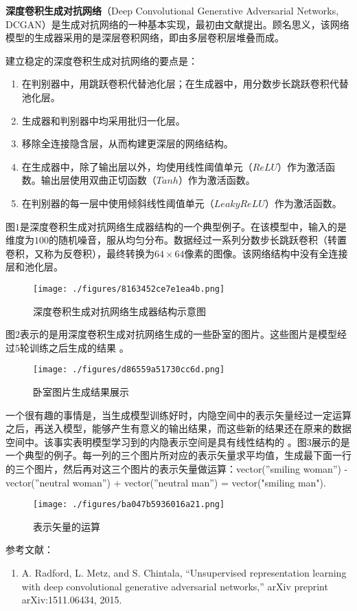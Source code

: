 

\textbf{深度卷积生成对抗网络}（Deep Convolutional Generative Adversarial Networks, DCGAN）是生成对抗网络的一种基本实现，最初由文献\cite{DCGAN}提出。顾名思义，该网络模型的生成器采用的是深层卷积网络，即由多层卷积层堆叠而成。

建立稳定的深度卷积生成对抗网络的要点是\cite{DCGAN}：
\begin{enumerate}
\item 在判别器中，用跳跃卷积代替池化层；在生成器中，用分数步长跳跃卷积代替池化层。
\item 生成器和判别器中均采用批归一化层。
\item 移除全连接隐含层，从而构建更深层的网络结构。
\item 在生成器中，除了输出层以外，均使用线性阈值单元（$ReLU$）作为激活函数。输出层使用双曲正切函数（$Tanh$）作为激活函数。
\item 在判别器的每一层中使用倾斜线性阈值单元（$Leaky ReLU$）作为激活函数。
\end{enumerate}

图$1$是深度卷积生成对抗网络生成器结构的一个典型例子。在该模型中，输入的是维度为$100$的随机噪音，服从均匀分布。数据经过一系列分数步长跳跃卷积（转置卷积，又称为反卷积），最终转换为$64 \times64$像素的图像。该网络结构中没有全连接层和池化层。
\begin{figure}[ht]
\centering
\texttt{[image: ./figures/8163452ce7e1ea4b.png]}
\caption{深度卷积生成对抗网络生成器结构示意图 \cite{DCGAN}} \label{fig_DCGAN_1}
\end{figure}

图$2$表示的是用深度卷积生成对抗网络生成的一些卧室的图片。这些图片是模型经过$5$轮训练之后生成的结果 \cite{DCGAN}。
\begin{figure}[ht]
\centering
\texttt{[image: ./figures/d86559a51730cc6d.png]}
\caption{卧室图片生成结果展示} \label{fig_DCGAN_2}
\end{figure}

一个很有趣的事情是，当生成模型训练好时，内隐空间中的表示矢量经过一定运算之后，再送入模型，能够产生有意义的输出结果，而这些新的结果还在原来的数据空间中。该事实表明模型学习到的内隐表示空间是具有线性结构的 \cite{DCGAN}。图$3$展示的是一个典型的例子。每一列的三个图片所对应的表示矢量求平均值，生成最下面一行的三个图片，然后再对这三个图片的表示矢量做运算：vector(”smiling woman”) - vector(”neutral woman”) + vector(”neutral man”) = vector("smiling man").

\begin{figure}[ht]
\centering
\texttt{[image: ./figures/ba047b5936016a21.png]}
\caption{表示矢量的运算} \label{fig_DCGAN_3}
\end{figure}




参考文献：
\begin{enumerate}
\item A. Radford, L. Metz, and S. Chintala, “Unsupervised representation learning with deep convolutional generative adversarial networks,” arXiv preprint arXiv:1511.06434, 2015.
\end{enumerate}